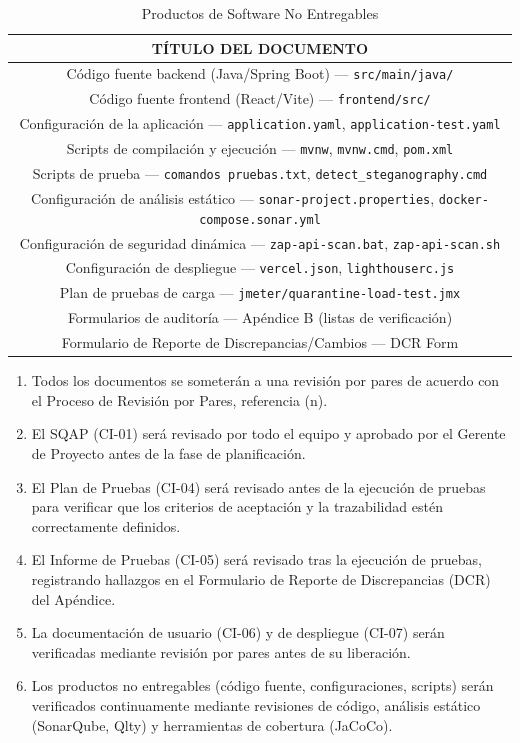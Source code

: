 \begin{table}[H]
\centering
\caption{Productos de Software No Entregables}
\label{tab:nondeliverable}
\begin{tabular}{|c|}
\hline
\textbf{TÍTULO DEL DOCUMENTO} \\
\hline
Código fuente backend (Java/Spring Boot) --- \texttt{src/main/java/} \\
\hline
Código fuente frontend (React/Vite) --- \texttt{frontend/src/} \\
\hline
Configuración de la aplicación --- \texttt{application.yaml}, \texttt{application-test.yaml} \\
\hline
Scripts de compilación y ejecución --- \texttt{mvnw}, \texttt{mvnw.cmd}, \texttt{pom.xml} \\
\hline
Scripts de prueba --- \texttt{comandos pruebas.txt}, \texttt{detect\_steganography.cmd} \\
\hline
Configuración de análisis estático --- \texttt{sonar-project.properties}, \texttt{docker-compose.sonar.yml} \\
\hline
Configuración de seguridad dinámica --- \texttt{zap-api-scan.bat}, \texttt{zap-api-scan.sh} \\
\hline
Configuración de despliegue --- \texttt{vercel.json}, \texttt{lighthouserc.js} \\
\hline
Plan de pruebas de carga --- \texttt{jmeter/quarantine-load-test.jmx} \\
\hline
Formularios de auditoría --- Apéndice B (listas de verificación) \\
\hline
Formulario de Reporte de Discrepancias/Cambios --- DCR Form \\
\hline
\end{tabular}
\end{table}


\begin{enumerate}
    \item Todos los documentos se someterán a una revisión por pares de acuerdo con el Proceso de Revisión por Pares, referencia (n).
    \item El SQAP (CI-01) será revisado por todo el equipo y aprobado por el Gerente de Proyecto antes de la fase de planificación.
    \item El Plan de Pruebas (CI-04) será revisado antes de la ejecución de pruebas para verificar que los criterios de aceptación y la trazabilidad estén correctamente definidos.
    \item El Informe de Pruebas (CI-05) será revisado tras la ejecución de pruebas, registrando hallazgos en el Formulario de Reporte de Discrepancias (DCR) del Apéndice.
    \item La documentación de usuario (CI-06) y de despliegue (CI-07) serán verificadas mediante revisión por pares antes de su liberación.
    \item Los productos no entregables (código fuente, configuraciones, scripts) serán verificados continuamente mediante revisiones de código, análisis estático (SonarQube, Qlty) y herramientas de cobertura (JaCoCo).
\end{enumerate}

